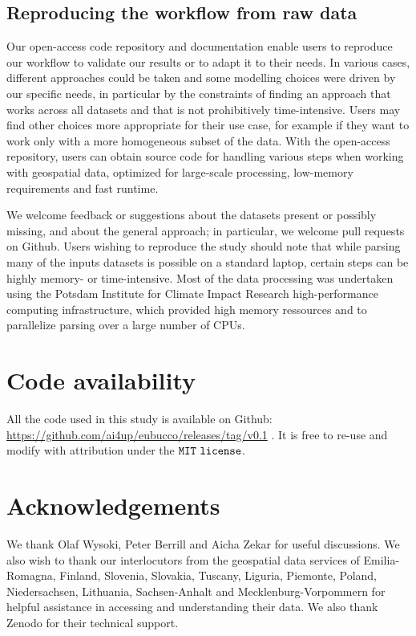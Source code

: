 \documentclass[fleqn,10pt]{wlscirep}
\begin{document}
\subsection*{Reproducing the workflow from raw data}
Our open-access code repository\cite{eubucco-0.1-code2022} and documentation enable users to reproduce our workflow to validate our results or to adapt it to their needs. In various cases, different approaches could be taken and some modelling choices were driven by our specific needs, in particular by the constraints of finding an approach that works across all datasets and that is not prohibitively time-intensive. Users may find other choices more appropriate for their use case, for example if they want to work only with a more homogeneous subset of the data. With the open-access repository, users can obtain source code for handling various steps when working with geospatial data, optimized for large-scale processing, low-memory requirements and fast runtime. 

We welcome feedback or suggestions about the datasets present or possibly missing, and about the general approach; in particular, we welcome pull requests on Github. Users wishing to reproduce the study should note that while parsing many of the inputs datasets is possible on a standard laptop, certain steps can be highly memory- or time-intensive. Most of the data processing was undertaken using the Potsdam Institute for Climate Impact Research high-performance computing infrastructure, which provided high memory ressources and to parallelize parsing over a large number of CPUs.

\section*{Code availability}

All the code used in this study is available on Github: \url{https://github.com/ai4up/eubucco/releases/tag/v0.1} \cite{eubucco-0.1-code2022}. It is free to re-use and modify with attribution under the ${\tt MIT\ license}$.





\section*{Acknowledgements} 

We thank Olaf Wysoki, Peter Berrill and Aicha Zekar for useful discussions. We also wish to thank our interlocutors from the geospatial data services of Emilia-Romagna, Finland, Slovenia, Slovakia, Tuscany, Liguria, Piemonte, Poland, Niedersachsen, Lithuania, Sachsen-Anhalt and Mecklenburg-Vorpommern  for helpful assistance in accessing and understanding their data. We also thank Zenodo for their technical support.
\end{document}
